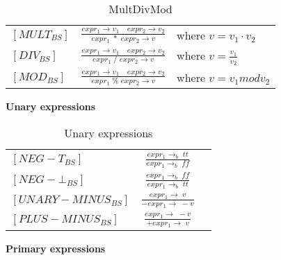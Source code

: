     \bgroup
    \def\arraystretch{3}
    \begin{table}[H]
    \centering
    \begin{tabular}{l c l}
        
        $[MULT_{BS}]$ &$\frac{expr_1 \rightarrow v_1 \quad expr_2 \rightarrow v_2}{expr_1\;*\;expr_2 \rightarrow v}$ & where $v = v_1 \cdot v_2$ \\
        
        $[DIV_{BS}]$ &$\frac{expr_1 \rightarrow v_1 \quad expr_2 \rightarrow v_2}{expr_1\;/\;expr_2 \rightarrow v}$ & where $v = \frac{v_1}{v_2}$ \\
        
        $[MOD_{BS}]$ &$\frac{expr_1 \rightarrow v_1 \quad expr_2 \rightarrow v_2}{expr_1\;\%\;expr_2 \rightarrow v}$ & where $v = v_1 mod v_2$ \\
        
        
    \end{tabular}
    \caption{MultDivMod}
    \label{tab:multdivmod}
    \end{table}
    \egroup

\noindent \textbf{Unary expressions}

     
    
    \bgroup
    \def\arraystretch{3}
    \begin{table}[H]
    \centering
    \begin{tabular}{l c l}
        
        $[NEG-T_{BS}]$ &$\frac{expr_1 \rightarrow_b\; tt}{expr_1 \rightarrow_b\; ff}$ &  \\
        
        $[NEG-\bot_{BS}]$ &$\frac{expr_1 \rightarrow_b\; ff}{expr_1 \rightarrow_b\; tt}$ &  \\
        
        $[UNARY-MINUS_{BS}]$ &$\frac{expr_1 \rightarrow\; v}{-expr_1 \rightarrow\; -v}$ &  \\
        
        $[PLUS-MINUS_{BS}]$ &$\frac{expr_1 \rightarrow\; -v}{+expr_1 \rightarrow\; v}$ &  \\
        
    \end{tabular}
    \caption{Unary expressions}
    \label{tab:unary}
    \end{table}
    \egroup
    
  
\noindent \textbf{Primary expressions}

    
    
